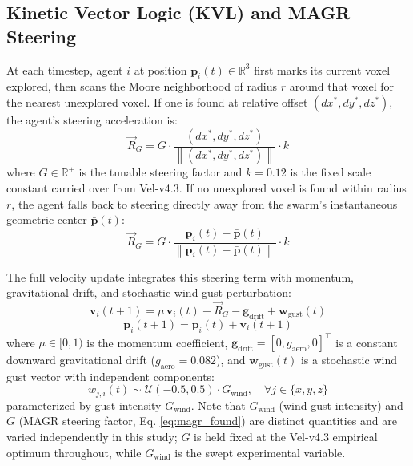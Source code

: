 \documentclass[10pt,journal]{IEEEtran}
\newcommand{\norm}[1]{\left\lVert#1\right\rVert}
\begin{document}
\subsection{Kinetic Vector Logic (KVL) and MAGR Steering}
At each timestep, agent $i$ at position $\mathbf{p}_i(t)\in\mathbb{R}^3$
first marks its current voxel explored, then scans the Moore neighborhood
of radius $r$ around that voxel for the nearest unexplored voxel. If one is
found at relative offset $(dx^*,dy^*,dz^*)$, the agent's steering
acceleration is:
\begin{equation}
\vec{R}_G = G \cdot \frac{(dx^*,dy^*,dz^*)}{\norm{(dx^*,dy^*,dz^*)}} \cdot k
\label{eq:magr_found}
\end{equation}
where $G\in\mathbb{R}^+$ is the tunable steering factor and $k=0.12$ is the
fixed scale constant carried over from Vel-v4.3. If no unexplored voxel is
found within radius $r$, the agent falls back to steering directly away
from the swarm's instantaneous geometric center $\bar{\mathbf{p}}(t)$:
\begin{equation}
\vec{R}_G = G \cdot \frac{\mathbf{p}_i(t) - \bar{\mathbf{p}}(t)}{\norm{\mathbf{p}_i(t) - \bar{\mathbf{p}}(t)}} \cdot k
\label{eq:magr_fallback}
\end{equation}

The full velocity update integrates this steering term with momentum,
gravitational drift, and stochastic wind gust perturbation:
\begin{equation}
\mathbf{v}_i(t+1) = \mu\,\mathbf{v}_i(t) + \vec{R}_G - \mathbf{g}_{\text{drift}} + \mathbf{w}_{\text{gust}}(t)
\label{eq:vel_update}
\end{equation}
\begin{equation}
\mathbf{p}_i(t+1) = \mathbf{p}_i(t) + \mathbf{v}_i(t+1)
\end{equation}
where $\mu\in[0,1)$ is the momentum coefficient, $\mathbf{g}_{\text{drift}} =
[0, g_{\text{aero}}, 0]^\top$ is a constant downward gravitational drift
($g_{\text{aero}}=0.082$), and $\mathbf{w}_{\text{gust}}(t)$ is a stochastic
wind gust vector with independent components:
\begin{equation}
w_{j,i}(t) \sim \mathcal{U}(-0.5, 0.5) \cdot G_{\text{wind}}, \quad \forall j\in\{x,y,z\}
\label{eq:gust}
\end{equation}
parameterized by gust intensity $G_{\text{wind}}$. Note that
$G_{\text{wind}}$ (wind gust intensity) and $G$ (MAGR steering factor, Eq.
\ref{eq:magr_found}) are distinct quantities and are varied independently
in this study; $G$ is held fixed at the Vel-v4.3 empirical optimum
throughout, while $G_{\text{wind}}$ is the swept experimental variable.
\end{document}
